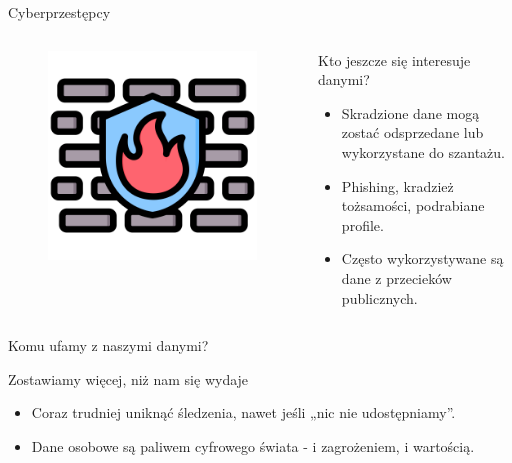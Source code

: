     
    \begin{frame}{Cyberprzestępcy}
    \begin{columns}[c]
        \begin{figure}
          \centering
          \includegraphics[height=0.45\textheight]{images/firewall.png}
        \end{figure}
        \begin{alertblock}{Kto jeszcze się interesuje danymi?}
            \begin{itemize}
              \item Skradzione dane mogą zostać odsprzedane lub wykorzystane do szantażu.
              \item Phishing, kradzież tożsamości, podrabiane profile.\cite{PHISHING_REPORT}
              \item Często wykorzystywane są dane z przecieków publicznych.
            \end{itemize}
        \end{alertblock}
    \end{columns}
    \end{frame}
    
    \begin{frame}{Komu ufamy z naszymi danymi?}
    \begin{alertblock}{Zostawiamy więcej, niż nam się wydaje}
        \begin{itemize}
          \item Coraz trudniej uniknąć śledzenia, nawet jeśli „nic nie udostępniamy”.
          \item Dane osobowe są paliwem cyfrowego świata - i zagrożeniem, i wartością.
        \end{itemize}
    \end{alertblock}
    \end{frame}